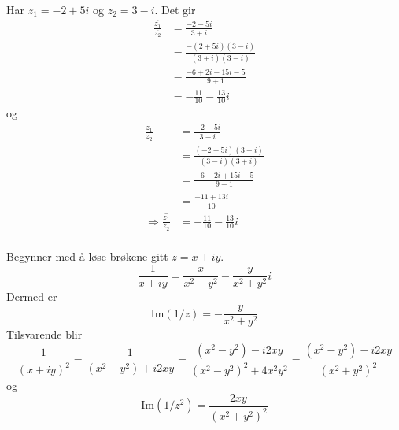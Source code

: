 \documentclass[11pt, a4paper, norsk]{NTNUoving}
\begin{document}
\begin{oppgave}[14]
  Har $z_1=-2+5i$ og $z_2=3-i$. Det gir
  \begin{align*}
    \frac{\overline{z_1}}{\overline{z_2}} &= \frac{-2-5i}{3+i} \\
                                &= \frac{-(2+5i)(3-i)}{(3+i)(3-i)} \\
                                &= \frac{-6+2i-15i-5}{9+1} \\
                                &= -\frac{11}{10} - \frac{13}{10} i 
  \end{align*}
  og
  \begin{align*}
    \frac{z_1}{z_2} &= \frac{-2+5i}{3-i} \\
                               &= \frac{(-2+5i)(3+i)}{(3-i)(3+i)} \\
                               &= \frac{-6-2i+15i-5}{9+1} \\
                               &= \frac{-11+13i}{10} \\
    \Rightarrow \overline{\frac{z_1}{z_2}} &= -\frac{11}{10}-\frac{13}{10}i \\
  \end{align*}
\end{oppgave}  
\begin{oppgave}[16]
  Begynner med å løse brøkene gitt $z=x+iy$.
  \[
    \frac{1}{x+iy} = \frac{x}{x^2+y^2}-\frac{y}{x^2+y^2}i
  \]  
  Dermed er
  \[
    \text{Im}(1/z)=-\frac{y}{x^2+y^2}
  \]
  Tilsvarende blir
  \[
    \frac{1}{(x+iy)^2}=\frac{1}{(x^2-y^2)+i2xy}=\frac{(x^2-y^2)-i2xy}{(x^2-y^2)^2+4x^2y^2}=\frac{(x^2-y^2)-i2xy}{(x^2+y^2)^2}
  \]
  og
  \[
    \text{Im}(1/z^2)=\frac{2xy}{(x^2+y^2)^2}
  \]  
\end{oppgave}  
\newpage
\end{document}
